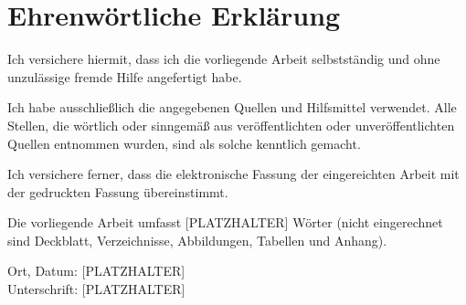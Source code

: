 \section*{Ehrenwörtliche Erklärung}

Ich versichere hiermit, dass ich die vorliegende Arbeit selbstständig und ohne unzulässige fremde Hilfe angefertigt habe.

Ich habe ausschließlich die angegebenen Quellen und Hilfsmittel verwendet. Alle Stellen, die wörtlich oder sinngemäß aus veröffentlichten oder unveröffentlichten Quellen entnommen wurden, sind als solche kenntlich gemacht.

Ich versichere ferner, dass die elektronische Fassung der eingereichten Arbeit mit der gedruckten Fassung übereinstimmt.

Die vorliegende Arbeit umfasst [PLATZHALTER] Wörter (nicht eingerechnet sind Deckblatt, Verzeichnisse, Abbildungen, Tabellen und Anhang).

\vspace{1.5cm}
\noindent Ort, Datum: [PLATZHALTER]\\[1.5cm]
\noindent Unterschrift: [PLATZHALTER]

